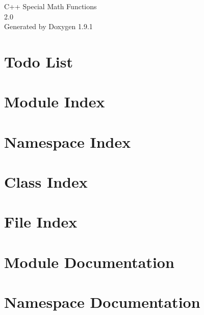 \let\mypdfximage\pdfximage\def\pdfximage{\immediate\mypdfximage}\documentclass[twoside]{book}
\newcommand{\+}{\discretionary{\mbox{\scriptsize$\hookleftarrow$}}{}{}}
\newcommand{\clearemptydoublepage}{%
  \newpage{\pagestyle{empty}\cleardoublepage}%
}
\begin{document}
\raggedbottom

\hypersetup{pageanchor=false,
             bookmarksnumbered=true,
             pdfencoding=unicode
            }
\begin{titlepage}
\vspace*{7cm}
\begin{center}%
{\Large C++ Special Math Functions \\[1ex]\large 2.\+0 }\\
\vspace*{1cm}
{\large Generated by Doxygen 1.9.1}\\
\end{center}
\end{titlepage}
\clearemptydoublepage
{}
\tableofcontents
\clearemptydoublepage
{}
\hypersetup{pageanchor=true}

\chapter{Todo List}
\label{todo}

\chapter{Module Index}

\chapter{Namespace Index}

\chapter{Class Index}

\chapter{File Index}

\chapter{Module Documentation}

\chapter{Namespace Documentation}

\end{document}
